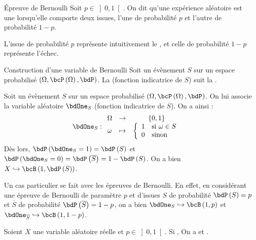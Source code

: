 \documentclass[a4paper,french,bookmarks]{article}
\begin{document}
    \begin{definition}{Épreuve de Bernoulli}{}
        Soit $p \in \left]0, 1\right[$. On dit qu'une expérience aléatoire est une  lorsqu'elle comporte deux issues, l'une de probabilité $p$ et l'autre de probabilité $1-p$.
    \end{definition}
    L'issue de probabilité $p$ représente intuitivement le , et celle de probabilité $1-p$ représente l'échec.
    \begin{property}{Construction d'une variable de Bernoulli}{}
        Soit un évènement $S$ sur un espace probabilisé $\left(\Omega, \bcP\left(\Omega\right), \bdP\right)$. La  (fonction indicatrice de $S$) suit la .
    \end{property}
    \begin{nproof}
        Soit un évènement $S$ sur un espace probabilisé $\left(\Omega, \bcP\left(\Omega\right), \bdP\right)$. On lui associe la variable aléatoire $\bdOne_S$ (fonction indicatrice de $S$). On a ainsi :
        \[ \bdOne_S : \begin{array}{ccc}
            \Omega &\to & \left\{0, 1 \right\}  \\
            \omega &\mapsto& \left\lbrace \begin{array}{ll}
                1 &\text{si} \ \omega \in S \\
                0 &\text{sinon} 
            \end{array}\right. 
        \end{array}\]
        Dès lors, $\bdP\left(\bdOne_S = 1\right) = \bdP\left(S\right)$ et $\bdP\left(\bdOne_S = 0\right) = \bdP\left(\overline{S}\right) = 1 - \bdP\left(S\right)$. On a bien $X \hookrightarrow \bcB\left(1, \bdP\left(S\right)\right)$. 
    \end{nproof}
    
    Un cas particulier se fait avec les épreuves de Bernoulli. En effet, en considérant une épreuve de Bernoulli de paramètre $p$ et d'issues $S$ de probabilité $\bdP\left(S\right) = p$ et $\overline{S}$ de probabilité $\bdP\left(\overline{S}\right) = 1 - p$, on a bien $\bdOne_S \hookrightarrow \bcB\left(1, p\right)$ et $\bdOne_{\overline{S}} \hookrightarrow \bcB\left(1, 1 - p\right)$.
    
    \begin{property}{}{}
        Soient $X$ une variable aléatoire réelle et $p \in \left]0, 1\right[$. Si , On a  et .
    \end{property}
    
\end{document}
